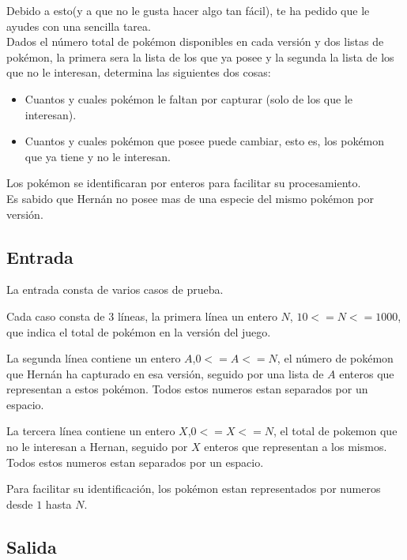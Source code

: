 \documentclass[letter,10pt]{article}
\begin{document}
Debido a esto(y a que no le gusta hacer algo tan fácil), te ha pedido que le ayudes con una sencilla tarea.\\

Dados el número total de pokémon disponibles en cada versión y dos listas de pokémon, la primera sera la lista de los que ya posee y la segunda la lista de los que no le interesan, determina las siguientes dos cosas:

\begin{itemize}
\item Cuantos y cuales pokémon  le faltan por capturar (solo de los que le interesan).
\item Cuantos y cuales pokémon que posee puede cambiar, esto es, los pokémon que ya tiene y no le interesan.
\end{itemize}

Los pokémon se identificaran por enteros para facilitar su procesamiento.\\

Es sabido que Hernán no posee mas de una especie del mismo pokémon por versión.\\ 

\subsection*{Entrada}

La entrada consta de varios casos de prueba.

Cada caso consta de 3 líneas, la primera línea un entero $N$, $10<=N<=1000$, que indica el total de pokémon en la versión del juego.

La segunda línea contiene un entero $A$,$0<=A<=N$, el número de pokémon que Hernán ha capturado en esa versión, seguido por una lista de $A$ enteros que representan a estos pokémon. Todos estos numeros estan separados por un espacio.

La tercera línea contiene un entero $X$,$0<=X<=N$, el total de pokemon que no le interesan a Hernan, seguido por $X$ enteros que representan a los mismos. Todos estos numeros estan separados por un espacio.

Para facilitar su identificación, los pokémon estan representados por numeros desde $1$ hasta $N$.

\subsection*{Salida}
\end{document}
